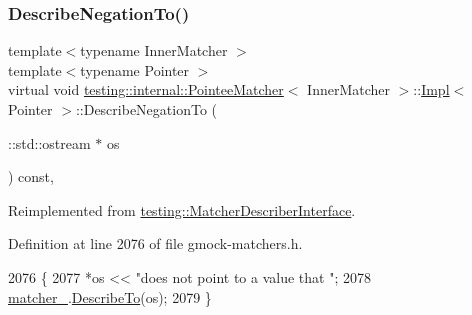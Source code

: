 \subsubsection{\texorpdfstring{Describe\+Negation\+To()}{DescribeNegationTo()}}
{\footnotesize\ttfamily template$<$typename Inner\+Matcher $>$ \\
template$<$typename Pointer $>$ \\
virtual void \hyperlink{classtesting_1_1internal_1_1PointeeMatcher}{testing\+::internal\+::\+Pointee\+Matcher}$<$ Inner\+Matcher $>$\+::\hyperlink{classtesting_1_1internal_1_1PointeeMatcher_1_1Impl}{Impl}$<$ Pointer $>$\+::Describe\+Negation\+To (\begin{DoxyParamCaption}\item[{\+::std\+::ostream $\ast$}]{os }\end{DoxyParamCaption}) const\hspace{0.3cm}{\ttfamily [inline]}, {\ttfamily [virtual]}}



Reimplemented from \hyperlink{classtesting_1_1MatcherDescriberInterface_a2071afbc47097c4d1c0064275af34db0}{testing\+::\+Matcher\+Describer\+Interface}.



Definition at line 2076 of file gmock-\/matchers.\+h.


\begin{DoxyCode}
2076                                                           \{
2077       *os << \textcolor{stringliteral}{"does not point to a value that "};
2078       \hyperlink{classtesting_1_1internal_1_1PointeeMatcher_1_1Impl_a8b6095eca981f76156d7e301cef455a0}{matcher\_}.\hyperlink{classtesting_1_1internal_1_1MatcherBase_a7e0c883c7745e0d646463077ef1c1267}{DescribeTo}(os);
2079     \}
\end{DoxyCode}
\mbox{\label{classtesting_1_1internal_1_1PointeeMatcher_1_1Impl_af56f2efe315e8f4b2c1824de54755f20}} 
